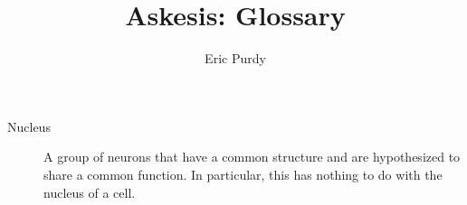 \documentclass{article}
\title{Askesis: Glossary} \author{Eric Purdy}
\theoremstyle{definition}
\begin{document}
\maketitle

\begin{description}
\item[Nucleus] A group of neurons that have a common structure and are
  hypothesized to share a common function. In particular, this has
  nothing to do with the nucleus of a cell.
\end{description}
\end{document}
